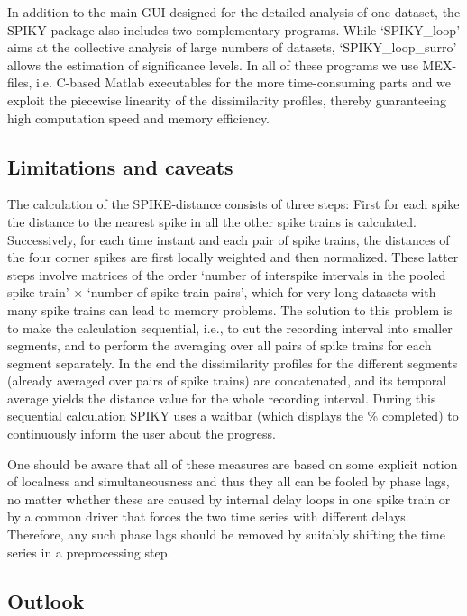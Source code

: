 \documentclass[10pt,twocolumn]{elsart5p}
\begin{document}
In addition to the main GUI designed for the detailed analysis of one dataset, the SPIKY-package also includes two complementary programs. While `SPIKY\_loop' aims at the collective analysis of large numbers of datasets, `SPIKY\_loop\_surro' allows the estimation of significance levels. In all of these programs we use MEX-files, i.e. C-based Matlab executables for the more time-consuming parts and we exploit the piecewise linearity of the dissimilarity profiles, thereby guaranteeing high computation speed and memory efficiency.


\subsection{\label{ss:Limitations} Limitations and caveats}

The calculation of the SPIKE-distance consists of three steps: First for each spike the distance to the nearest spike in all the other spike trains is calculated. Successively, for each time instant and each pair of spike trains, the distances of the four corner spikes are first locally weighted and then normalized. These latter steps involve matrices of the order `number of interspike intervals in the pooled spike train' $\times$ `number of spike train pairs', which for very long datasets with many spike trains can lead to memory problems. The solution to this problem is to make the calculation sequential, i.e., to cut the recording interval into smaller segments, and to perform the averaging over all pairs of spike trains for each segment separately. In the end the dissimilarity profiles for the different segments (already averaged over pairs of spike trains) are concatenated, and its temporal average yields the distance value for the whole recording interval. During this sequential calculation SPIKY uses a waitbar (which displays the \% completed) to continuously inform the user about the progress.

One should be aware that all of these measures are based on some explicit notion of localness and simultaneousness 
and thus they all can be fooled by phase lags, no matter whether these are caused by internal delay loops in one spike train or by a common driver that forces the two time series with different delays. Therefore, any such phase lags should be removed by suitably shifting the time series in a preprocessing step.



\subsection{\label{ss:Outlook} Outlook}
\end{document}
